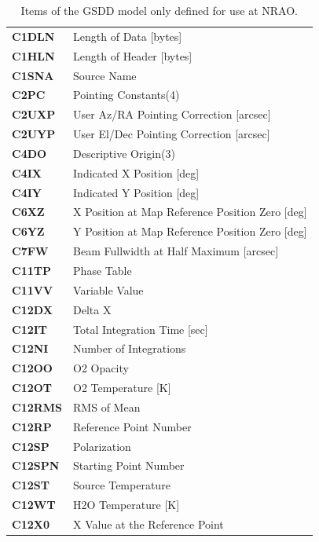 \documentclass[final,authoryear,5p,times,twocolumn]{elsarticle}
\begin{document}
\begin{table}[t]
\caption{Items of the GSDD model only defined for use at NRAO.}
\label{tab:nraoonly}
\begin{center}
\begin{tabular}{lp{2.5in}}
\hline
\textbf{C1DLN} & Length of Data [bytes]\\
\textbf{C1HLN} & Length of Header [bytes]\\
\textbf{C1SNA} & Source Name\\
\textbf{C2PC} & Pointing Constants(4)\\
\textbf{C2UXP} & User Az/RA Pointing Correction [arcsec]\\
\textbf{C2UYP} & User El/Dec Pointing Correction [arcsec]\\
\textbf{C4DO} & Descriptive Origin(3)\\
\textbf{C4IX} & Indicated X Position [deg]\\
\textbf{C4IY} & Indicated Y Position [deg]\\
\textbf{C6XZ} & X Position at Map Reference Position Zero [deg]\\
\textbf{C6YZ} & Y Position at Map Reference Position Zero [deg]\\
\textbf{C7FW} & Beam Fullwidth at Half Maximum [arcsec]\\
\textbf{C11TP} & Phase Table\\
\textbf{C11VV} & Variable Value\\
\textbf{C12DX} & Delta X\\
\textbf{C12IT} & Total Integration Time [sec]\\
\textbf{C12NI} & Number of Integrations\\
\textbf{C12OO} & O2 Opacity\\
\textbf{C12OT} & O2 Temperature [K]\\
\textbf{C12RMS} & RMS of Mean\\
\textbf{C12RP} & Reference Point Number\\
\textbf{C12SP} & Polarization\\
\textbf{C12SPN} & Starting Point Number\\
\textbf{C12ST} & Source Temperature\\
\textbf{C12WT} & H2O Temperature [K]\\
\textbf{C12X0} & X Value at the Reference Point\\
\hline
\end{tabular}
\end{center}
\end{table}
\end{document}
